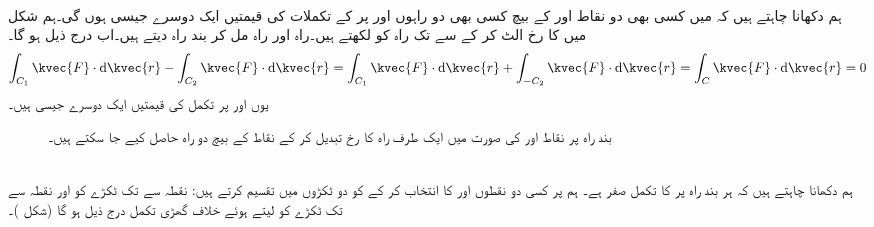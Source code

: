 \\
ہم دکھانا چاہتے ہیں کہ  میں کسی بھی دو نقاط  اور  کے بیچ کسی بھی  دو راہوں  اور  پر  کے تکملات کی قیمتیں ایک دوسرے جیسی ہوں گی۔ہم شکل  میں  کا رخ الٹ کر کے  سے  تک راہ کو  لکھتے ہیں۔راہ  اور راہ  مل کر بند راہ  دیتے ہیں۔اب درج ذیل ہو گا۔
\begin{align*}
\int_{C_1}\kvec{F}\cdot\dif\kvec{r}-\int_{C_2}\kvec{F}\cdot\dif\kvec{r}=\int_{C_1}\kvec{F}\cdot\dif\kvec{r}+\int_{-C_2}\kvec{F}\cdot\dif\kvec{r}=\int_{C}\kvec{F}\cdot\dif\kvec{r}=0
\end{align*}
یوں  اور  پر تکمل کی قیمتیں ایک دوسرے جیسی  ہیں۔
\begin{figure}
\centering
{}
\begin{subfigure}{0.45\textwidth}
\centering
{}
\end{subfigure}\hfill
\begin{subfigure}{0.45\textwidth}
\centering
{}
\end{subfigure}
\caption{
بند راہ پر نقاط  اور  کی صورت میں ایک طرف راہ کا رخ تبدیل کر کے نقاط کے بیچ دو راہ حاصل کیے جا سکتے ہیں۔
}
\label{شکل_سمتی_تکمل_بند_راہ_پر_دو_نقاط}
\end{figure}
\\
ہم دکھانا چاہتے ہیں کہ ہر بند راہ  پر  کا تکمل صفر ہے۔ ہم  پر کسی دو نقطوں  اور  کا انتخاب کر کے  کو دو ٹکڑوں میں تقسیم کرتے ہیں: نقطہ  سے  تک ٹکڑے کو   اور نقطہ  سے  تک ٹکڑے کو  لیتے ہوئے خلاف گھڑی تکمل درج ذیل ہو گا (شکل )۔ 
